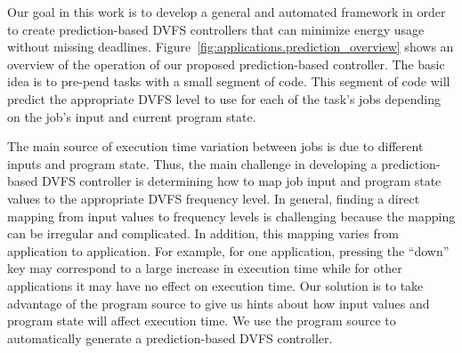 Our goal in this work is to develop a general and automated framework in order to
create prediction-based DVFS controllers that can minimize energy usage without
missing deadlines.
Figure~\ref{fig:applications.prediction_overview} shows an overview of the operation of our
proposed prediction-based controller. The basic idea is to pre-pend tasks 
with a small segment of code. This segment of code will predict
the appropriate DVFS level to use for each of the task's jobs depending on the job's input and
current program state.

The main source of execution time variation between jobs is due to different
inputs and program state. Thus, the main challenge in developing a
prediction-based DVFS controller is determining how to map job input and
program state values to the appropriate DVFS frequency level. In general,
finding a direct mapping from input values to frequency levels is challenging
because the mapping can be irregular and complicated. In addition, this mapping
varies from application to application. For example, for one application,
pressing the ``down'' key may correspond to a large increase in execution time
while for other applications it may have no effect on execution time. Our
solution is to take advantage of the program source to give us hints about how
input values and program state will affect execution time. We use the program
source to automatically generate a prediction-based DVFS controller.



